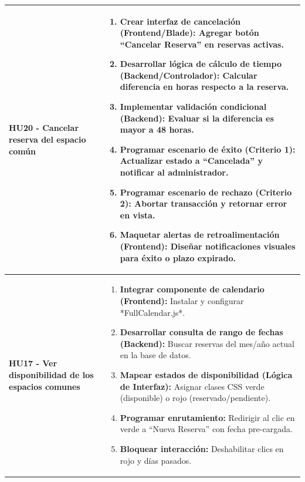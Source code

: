 \begin{longtable}{|p{4.5cm}|p{10.5cm}|}
    \\ \hline

        \textbf{HU20 - Cancelar reserva del espacio común} 
        
        & 

            \begin{enumerate}[leftmargin=*,nosep]
                \item \textbf{Crear interfaz de cancelación (Frontend/Blade):} Agregar botón ``Cancelar Reserva'' en reservas activas.
                \item \textbf{Desarrollar lógica de cálculo de tiempo (Backend/Controlador):} Calcular diferencia en horas respecto a la reserva.
                \item \textbf{Implementar validación condicional (Backend):} Evaluar si la diferencia es mayor a 48 horas.
                \item \textbf{Programar escenario de éxito (Criterio 1):} Actualizar estado a ``Cancelada'' y notificar al administrador.
                \item \textbf{Programar escenario de rechazo (Criterio 2):} Abortar transacción y retornar error en vista.
                \item \textbf{Maquetar alertas de retroalimentación (Frontend):} Diseñar notificaciones visuales para éxito o plazo expirado.
            \end{enumerate} 
        
    \\ \hline

        \textbf{HU17 - Ver disponibilidad de los espacios comunes} 
        
        & 

            \begin{enumerate}[leftmargin=*,nosep]
                \item \textbf{Integrar componente de calendario (Frontend):} Instalar y configurar *FullCalendar.js*.
                \item \textbf{Desarrollar consulta de rango de fechas (Backend):} Buscar reservas del mes/año actual en la base de datos.
                \item \textbf{Mapear estados de disponibilidad (Lógica de Interfaz):} Asignar clases CSS verde (disponible) o rojo (reservado/pendiente).
                \item \textbf{Programar enrutamiento:} Redirigir al clic en verde a ``Nueva Reserva'' con fecha pre-cargada.
                \item \textbf{Bloquear interacción:} Deshabilitar clics en rojo y días pasados.
            \end{enumerate} 
        

\end{longtable}
